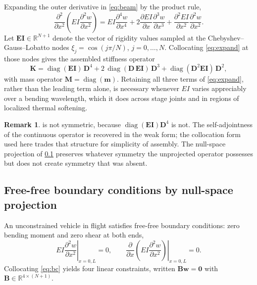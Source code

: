 \documentclass[11pt,a4paper]{article}
\theoremstyle{definition}
\newtheorem{remark}[theorem]{Remark}
\numberwithin{equation}{section}
\newcommand{\R}{\mathbb{R}}
\newcommand{\diag}{\operatorname{diag}}
\begin{document}
Expanding the outer derivative in \cref{eq:beam} by the product rule,
\begin{equation}
\label{eq:expand}
\frac{\partial^2}{\partial x^2}\left(EI \frac{\partial^2 w}{\partial x^2}\right)
= EI \frac{\partial^4 w}{\partial x^4}
+ 2 \frac{\partial EI}{\partial x}\frac{\partial^3 w}{\partial x^3}
+ \frac{\partial^2 EI}{\partial x^2}\frac{\partial^2 w}{\partial x^2}.
\end{equation}
Let $\mathbf{EI} \in \R^{N+1}$ denote the vector of rigidity values sampled at the Chebyshev--Gauss--Lobatto nodes $\xi_j = \cos(j\pi/N)$, $j = 0,\dots,N$. Collocating \cref{eq:expand} at those nodes gives the assembled stiffness operator
\begin{equation}
\label{eq:stiffness}
\mathbf{K} = \diag(\mathbf{EI})\,\mathbf{D}^4 + 2\,\diag(\mathbf{D}\,\mathbf{EI})\,\mathbf{D}^3 + \diag(\mathbf{D}^2 \mathbf{EI})\,\mathbf{D}^2,
\end{equation}
with mass operator $\mathbf{M} = \diag(\mathbf{m})$. Retaining all three terms of \cref{eq:expand}, rather than the leading term alone, is necessary whenever $EI$ varies appreciably over a bending wavelength, which it does across stage joints and in regions of localized thermal softening.

\begin{remark}
 is not symmetric, because $\diag(\mathbf{EI})\mathbf{D}^4$ is not. The self-adjointness of the continuous operator is recovered in the weak form; the collocation form used here trades that structure for simplicity of assembly. The null-space projection of \cref{sec:nsa} preserves whatever symmetry the unprojected operator possesses but does not create symmetry that was absent.
\end{remark}

\subsection{Free-free boundary conditions by null-space projection}
\label{sec:nsa}

An unconstrained vehicle in flight satisfies free-free boundary conditions: zero bending moment and zero shear at both ends,
\begin{equation}
\label{eq:bc}
\left. EI \frac{\partial^2 w}{\partial x^2} \right|_{x = 0, L} = 0,
\qquad
\left. \frac{\partial}{\partial x}\!\left(EI \frac{\partial^2 w}{\partial x^2}\right) \right|_{x = 0, L} = 0 .
\end{equation}
Collocating \cref{eq:bc} yields four linear constraints, written $\mathbf{B}\mathbf{w} = \mathbf{0}$ with $\mathbf{B} \in \R^{4 \times (N+1)}$.
\end{document}
